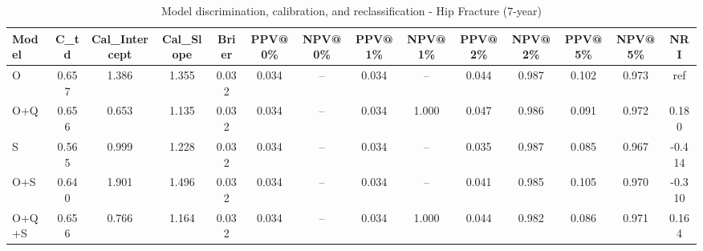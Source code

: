 \begin{table}[htbp]
\centering
\small
\caption{Model discrimination, calibration, and reclassification - Hip Fracture (7-year)}
\label{tab:perf_pd_7y}
\begin{tabular}{lccccccccccccc}
\toprule
Model & C\_td & Cal\_Intercept & Cal\_Slope & Brier & PPV@0\% & NPV@0\% & PPV@1\% & NPV@1\% & PPV@2\% & NPV@2\% & PPV@5\% & NPV@5\% & NRI \\
\midrule
O & 0.657 & 1.386 & 1.355 & 0.032 & 0.034 & -- & 0.034 & -- & 0.044 & 0.987 & 0.102 & 0.973 & ref \\
O+Q & 0.656 & 0.653 & 1.135 & 0.032 & 0.034 & -- & 0.034 & 1.000 & 0.047 & 0.986 & 0.091 & 0.972 & 0.180 \\
S & 0.565 & 0.999 & 1.228 & 0.032 & 0.034 & -- & 0.034 & -- & 0.035 & 0.987 & 0.085 & 0.967 & -0.414 \\
O+S & 0.640 & 1.901 & 1.496 & 0.032 & 0.034 & -- & 0.034 & -- & 0.041 & 0.985 & 0.105 & 0.970 & -0.310 \\
O+Q+S & 0.656 & 0.766 & 1.164 & 0.032 & 0.034 & -- & 0.034 & 1.000 & 0.044 & 0.982 & 0.086 & 0.971 & 0.164 \\
\bottomrule
\end{tabular}
\end{table}